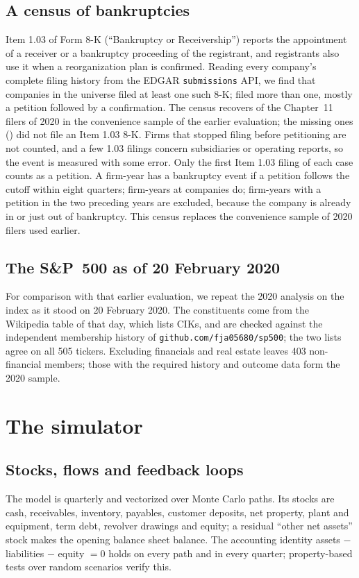 \subsection{A census of bankruptcies}
Item 1.03 of Form 8-K (``Bankruptcy or Receivership'') reports the appointment of a receiver or a bankruptcy proceeding of the registrant, and registrants also use it when a reorganization plan is confirmed. Reading every company's complete filing history from the EDGAR \texttt{submissions} API, we find that \UniverseBk{} companies in the universe filed at least one such 8-K; \CensusRepeat{} filed more than one, mostly a petition followed by a confirmation. The census recovers \CensusFound{} of the \CensusLegacy{} Chapter~11 filers of 2020 in the convenience sample of the earlier evaluation; the missing ones (\CensusMissing) did not file an Item 1.03 8-K. Firms that stopped filing before petitioning are not counted, and a few 1.03 filings concern subsidiaries or operating reports, so the event is measured with some error. Only the first Item 1.03 filing of each case counts as a petition. A firm-year has a bankruptcy event if a petition follows the cutoff within eight quarters; \BkPanEv{} firm-years at \BkPanFirms{} companies do; firm-years with a petition in the two preceding years are excluded, because the company is already in or just out of bankruptcy. This census replaces the convenience sample of \CensusLegacy{} 2020 filers used earlier.

\subsection{The S\&P~500 as of 20 February 2020}
For comparison with that earlier evaluation, we repeat the 2020 analysis on the index as it stood on 20 February 2020. The constituents come from the Wikipedia table of that day, which lists CIKs, and are checked against the independent membership history of \texttt{github.com/fja05680/sp500}; the two lists agree on all 505 tickers. Excluding financials and real estate leaves 403 non-financial members; those with the required history and outcome data form the 2020 sample.

\section{The simulator}\label{sec:model}

\subsection{Stocks, flows and feedback loops}
The model is quarterly and vectorized over Monte Carlo paths. Its stocks are cash, receivables, inventory, payables, customer deposits, net property, plant and equipment, term debt, revolver drawings and equity; a residual ``other net assets'' stock makes the opening balance sheet balance. The accounting identity assets $-$ liabilities $-$ equity $=0$ holds on every path and in every quarter; property-based tests over random scenarios verify this.

